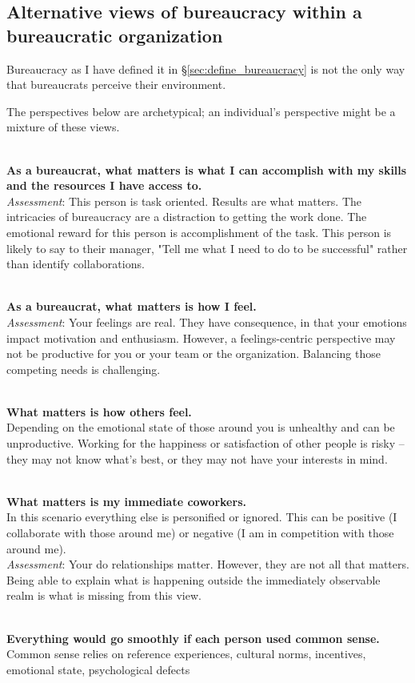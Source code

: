 \subsection{Alternative views of bureaucracy within a bureaucratic organization\label{sec:alternative_views_from_within}}

Bureaucracy as I have defined it in \S\ref{sec:define_bureaucracy} is not the only way that bureaucrats perceive their environment. 

The perspectives below are archetypical; an individual's perspective might be a mixture of these views.

\ \\

\textbf{As a bureaucrat, what matters is what I can accomplish with my skills and the resources I have access to.} \\
\textit{Assessment}: This person is task oriented. Results are what matters. The intricacies of bureaucracy are a distraction to getting the work done. The emotional reward for this person is accomplishment of the task. This person is likely to say to their manager, "Tell me what I need to do to be successful" rather than identify collaborations.

\ \\

\textbf{As a bureaucrat, what matters is how I feel.} \\
\textit{Assessment}: Your feelings are real. They have consequence, in that your emotions impact motivation and enthusiasm. However, a feelings-centric perspective may not be productive for you or your team or the organization. Balancing those competing needs is challenging.

\ \\ 

\textbf{What matters is how others feel.}\\
Depending on the emotional state of those around you is unhealthy and can be unproductive. Working for the happiness or satisfaction of other people is risky -- they may not know what's best, or they may not have your interests in mind.

\ \\

\textbf{What matters is my immediate coworkers.}\\
In this scenario everything else is personified or ignored. This can be positive (I collaborate with those around me) or negative (I am in competition with those around me). \\
\textit{Assessment}: Your do relationships matter. However, they are not all that matters. Being able to explain what is happening outside the immediately observable realm is what is missing from this view. 

\ \\

\textbf{Everything would go smoothly if each person used common sense.}\\

Common sense relies on reference experiences, cultural norms, incentives, emotional state, psychological defects